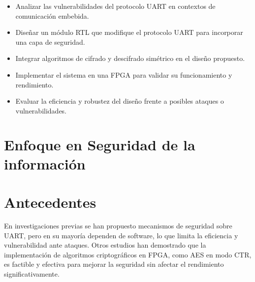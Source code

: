 \begin{itemize}
\item Analizar las vulnerabilidades del protocolo UART en contextos de comunicación embebida.
\item Diseñar un módulo RTL que modifique el protocolo UART para incorporar una capa de seguridad.
\item Integrar algoritmos de cifrado y descifrado simétrico en el diseño propuesto.
\item Implementar el sistema en una FPGA para validar su funcionamiento y rendimiento.
\item Evaluar la eficiencia y robustez del diseño frente a posibles ataques o vulnerabilidades.
\end{itemize}

\newpage
\section{Enfoque en Seguridad de la informaci\'on}



\section{Antecedentes}
En investigaciones previas se han propuesto mecanismos de seguridad sobre UART, pero en su mayoría dependen de software, lo que limita la eficiencia y vulnerabilidad ante ataques. Otros estudios han demostrado que la implementación de algoritmos criptográficos en FPGA, como AES en modo CTR, es factible y efectiva para mejorar la seguridad sin afectar el rendimiento significativamente.







\endinput 